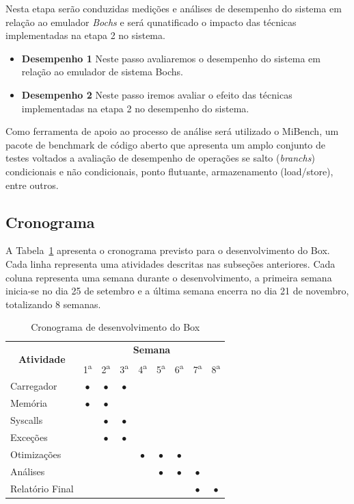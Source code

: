 \documentclass[11pt,twoside]{article}
\begin{document}
Nesta etapa serão conduzidas medições e análises de desempenho do sistema em relação ao emulador \emph{Bochs} e será qunatificado o impacto das técnicas implementadas na etapa 2 no sistema.

\begin{itemize}
 \item \textbf{Desempenho 1} Neste passo avaliaremos o desempenho do sistema em relação ao emulador de sistema Bochs.
 \item \textbf{Desempenho 2} Neste passo iremos avaliar o efeito das técnicas implementadas na etapa 2 no desempenho do sistema.
\end{itemize}

Como ferramenta de apoio ao processo de análise será utilizado o MiBench\cite{Guthaus2001}, um pacote de benchmark de código aberto que apresenta um amplo conjunto de testes voltados a avaliação de desempenho de operações se salto (\emph{branchs}) condicionais e não condicionais, ponto flutuante, armazenamento (load/store), entre outros.
 
\subsection{Cronograma}

A Tabela~\ref{tab:cronograma} apresenta o cronograma previsto para o desenvolvimento do Box.
Cada linha representa uma atividades descritas nas subseções anteriores. Cada coluna representa
uma semana durante o desenvolvimento, a primeira semana inicia-se no dia 25 de setembro e a
última semana encerra no dia 21 de novembro, totalizando 8 semanas.

\begin{table}[h]
\centering
\begin{tabular}{|l|c|c|c|c|c|c|c|c|} \hline
\multicolumn{1}{|c|}{\multirow{2}{*}{\textbf{Atividade}}} & \multicolumn{8}{c|}{\textbf{Semana}} \\ \cline{2-9}
\multicolumn{1}{|c|}{} & 1\textsuperscript{a} & 2\textsuperscript{a} & 3\textsuperscript{a} & 4\textsuperscript{a} & 5\textsuperscript{a} & 6\textsuperscript{a} & 7\textsuperscript{a} & 8\textsuperscript{a} \\ \hline
Carregador  	& $\bullet$ & $\bullet$ & $\bullet$ &  &  &  &  &  \\ \hline
Memória     	& $\bullet$ & $\bullet$ & &  &  &  &  &  \\ \hline
Syscalls    	&  & $\bullet$ & $\bullet$ &  &  &  &  &  \\ \hline
Exceções    	&  & $\bullet$ & $\bullet$ &  &  &  &  &  \\ \hline
Otimizações 	&  &  &  & $\bullet$ & $\bullet$ & $\bullet$ &  &  \\ \hline
Análises    	&  &  &  &  & $\bullet$ & $\bullet$ & $\bullet$ &  \\ \hline
Relatório Final	&  &  &  &  &  &  & $\bullet$ & $\bullet$ \\ \hline
\end{tabular}
\caption{Cronograma de desenvolvimento do Box}
\label{tab:cronograma}
\end{table}
\end{document}
